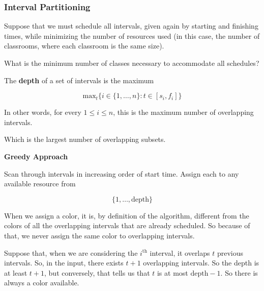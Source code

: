 \documentclass[12pt]{article}
\begin{document}
  \subsubsection{Interval Partitioning}

  Suppose that we must schedule all intervals, given again by starting and
  finishing times, while minimizing the number of resources used (in this case,
  the number of classrooms, where each classroom is the same size).

  What is the minimum number of classes necessary to accommodate all schedules?


   {
    The {\bf depth} of a set of intervals is the maximum

    \[
      \text{max}_t \Big\{i \in \{ 1, \dots, n\} : t \in [s_i, f_i] \Big\}
    \]

    In other words, for every $1 \le i \le n$, this is the maximum number of
    overlapping intervals.

    Which is the largest number of overlapping subsets.
  }


  {\bf Greedy Approach}

  Scan through intervals in increasing order of start time. Assign each to any
  available resource from

  \[
    \{1, \dots, \text{depth}\}
  \]

  {
    When we assign a color, it is, by definition of the algorithm, different from
    the colors of all the overlapping intervals that are already scheduled. So
    because of that, we never assign the same color to overlapping intervals.

    Suppose that, when we are considering the $i^\text{th}$ interval, it overlaps
    $t$ previous intervals. So, in the input, there exists $t + 1$ overlapping
    intervals. So the depth is at least $t + 1$, but conversely, that tells us
    that $t$ is at most $\text{depth} - 1$. So there is always a color available.
  }
\end{document}
